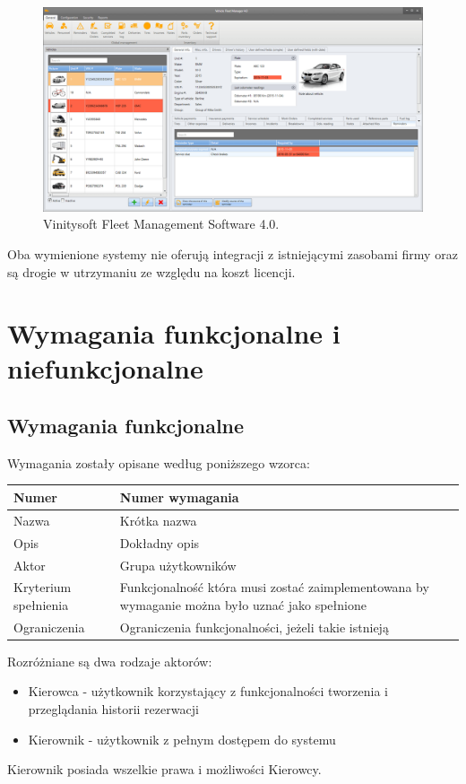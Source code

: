 \documentclass[eng,printmode,openany]{mgr}
\begin{document}
	\begin{figure}[H]
		\centering
		\includegraphics[width=\textwidth]{images/vinitysoft.png}
		\caption{Vinitysoft Fleet Management Software 4.0.}
	\end{figure}

	Oba wymienione systemy nie oferują integracji z istniejącymi zasobami firmy oraz są drogie w utrzymaniu ze względu na koszt licencji.
	\newpage
	\chapter{Wymagania funkcjonalne i niefunkcjonalne}
	\section{Wymagania funkcjonalne}
	Wymagania zostały opisane według poniższego wzorca:
	\begin{table}[H]
		\begin{tabularx}{\textwidth}{|l|X|}
			\hline
			Numer                & Numer wymagania \\ \hline
			Nazwa                & Krótka nazwa\\ \hline
			Opis                 & Dokładny opis\\ \hline
			Aktor                & Grupa użytkowników\\ \hline
			Kryterium spełnienia & Funkcjonalność która musi zostać zaimplementowana by wymaganie można było uznać jako spełnione\\ \hline
			Ograniczenia         & Ograniczenia funkcjonalności, jeżeli takie istnieją\\ \hline
		\end{tabularx}
	\end{table}
	Rozróżniane są dwa rodzaje aktorów:
	\begin{itemize}
		\item Kierowca - użytkownik korzystający z funkcjonalności tworzenia i przeglądania historii rezerwacji
		\item Kierownik - użytkownik z pełnym dostępem do systemu
	\end{itemize}
	Kierownik posiada wszelkie prawa i możliwości Kierowcy.
	
\end{document}
